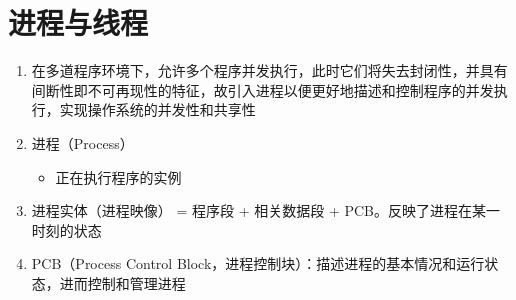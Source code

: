 \documentclass[./operating-systems.tex]{subfiles}
\begin{document}
    \section{进程与线程}

    \begin{enumerate}
        \item 在多道程序环境下，允许多个程序并发执行，此时它们将失去封闭性，并具有间断性即不可再现性的特征，故引入进程以便更好地描述和控制程序的并发执行，实现操作系统的并发性和共享性
        \item 进程（Process）
        \begin{itemize}
            \item 正在执行程序的实例
        \end{itemize}
        \item 进程实体（进程映像） = 程序段 + 相关数据段 + PCB。反映了进程在某一时刻的状态
        \item PCB（Process Control Block，进程控制块）：描述进程的基本情况和运行状态，进而控制和管理进程
    \end{enumerate}
\end{document}
